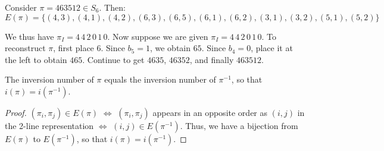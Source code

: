 \documentclass[a4paper]{article}
\begin{document}
\begin{example}
Consider $\pi=463512\in S_6$. Then:
\begin{equation*}
E(\pi)=\{(4,3),(4,1),(4,2),(6,3),(6,5),(6,1),(6,2),(3,1),(3,2),(5,1),(5,2)\}
\end{equation*}

We thus have $\pi_I=4\,4\,2\,0\,1\,0$. Now suppose we are given $\pi_I=4\,4\,2\,0\,1\,0$. To reconstruct $\pi$, first place $6$. Since $b_5=1$, we obtain $65$. Since $b_4=0$, place it at the left to obtain $465$. Continue to get $4635$, $46352$, and finally $463512$.
\end{example}

\begin{theorem}
The inversion number of $\pi$ equals the inversion number of $\pi^{-1}$, so that $i(\pi)=i(\pi^{-1})$.

\begin{hl}
\begin{proof}
$(\pi_i,\pi_j)\in E(\pi)$ $\iff$ $(\pi_i,\pi_j)$ appears in an opposite order as $(i,j)$ in the 2-line representation $\iff$ $(i,j)\in E(\pi^{-1})$. Thus, we have a bijection from $E(\pi)$ to $E(\pi^{-1})$, so that $i(\pi)=i(\pi^{-1})$.
\end{proof}
\end{hl}
\end{theorem}
\end{document}
